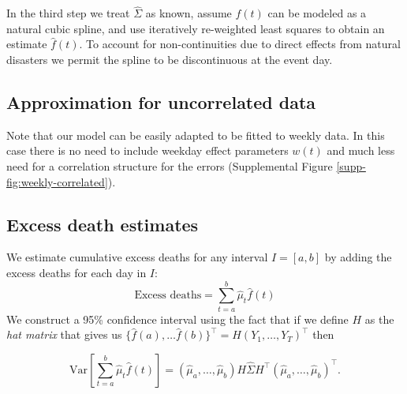 \documentclass[11pt]{article}
\begin{document}
In the third step we treat $\hat{\Sigma}$ as known, assume $f(t)$ can be modeled as a natural cubic spline, and use iteratively re-weighted least squares to obtain an estimate $\hat{f}(t)$. To account for non-continuities due to direct effects from natural disasters we permit the spline to be discontinuous at the event day. 

\subsection{Approximation for uncorrelated data}
Note that our model can be easily adapted to be fitted to weekly data. In this case there is no need to include weekday effect parameters $w(t)$ and much less need for a correlation structure for the errors (Supplemental Figure \ref{supp-fig:weekly-correlated}). 

\subsection{Excess death estimates}
\label{subsec:excess-deaths}
We estimate cumulative excess deaths for any interval $I = [a, b]$ 
by adding the excess deaths for each day
in $I$: 
\begin{equation*}
    \mbox{Excess deaths} = \sum_{t = a}^b \hat{\mu}_t \hat{f}(t) 
\end{equation*}
We construct a 95\% confidence interval using the fact that if we define $H$ as the \emph{hat matrix} that gives us 
$\{ \hat{f}(a), \dots \hat{f}(b) \}^\top = H (Y_1, \dots, Y_T)^\top$ then

 \begin{equation*}
    \mbox{Var}\left[\sum_{t = a}^b \hat{\mu}_t \hat{f}(t) \right] = (\hat{\mu}_a,\dots,\hat{\mu}_b) H \hat{\Sigma} H^\top (\hat{\mu}_a,\dots,\hat{\mu}_b)^\top.
 \end{equation*}
 
\end{document}
